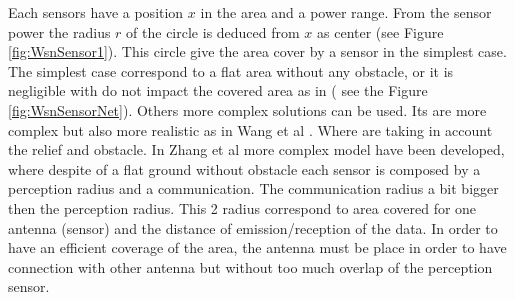 Each sensors have a position $x$ in the area and a power range. From the sensor power  the radius $r$ of the circle is deduced from $x$ as center (see Figure \ref{fig:WsnSensor1}). This circle give the area cover by a sensor in the simplest case. 
The simplest case correspond to a flat area without any obstacle, or it is negligible with do not impact the covered area as in \cite{200*kulkarni2011,174*zhang2016} ( see the Figure \ref{fig:WsnSensorNet}).  
Others more complex solutions can be used. Its are more complex but also more realistic as in Wang et al \cite{59*wang2008}. Where are taking in account the relief and obstacle. 
In Zhang et al \cite{174*zhang2016} more complex model have been developed, where despite of a flat ground without obstacle each sensor is composed by a perception radius and a communication. The communication radius a bit bigger then the perception radius. This 2 radius correspond to area covered for one antenna (sensor) and the distance of emission/reception of the data.  In order to have an efficient coverage of the area, the antenna must be place in order to have connection with other antenna but without too much overlap of the perception sensor.\\

